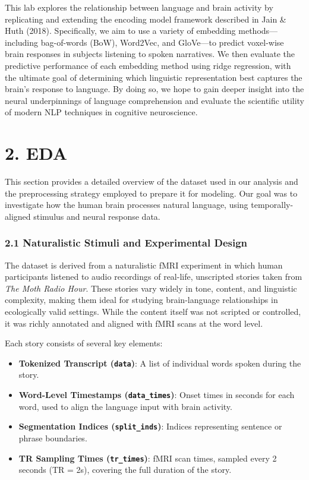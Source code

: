 \documentclass[11pt]{article}
\begin{document}
This lab explores the relationship between language and brain activity
by replicating and extending the encoding model framework described in
Jain \& Huth (2018). Specifically, we aim to use a variety of embedding
methods---including bag-of-words (BoW), Word2Vec, and GloVe---to predict
voxel-wise brain responses in subjects listening to spoken narratives.
We then evaluate the predictive performance of each embedding method
using ridge regression, with the ultimate goal of determining which
linguistic representation best captures the brain's response to
language. By doing so, we hope to gain deeper insight into the neural
underpinnings of language comprehension and evaluate the scientific
utility of modern NLP techniques in cognitive neuroscience.

    \hypertarget{eda}{%
\section{2. EDA}\label{eda}}

This section provides a detailed overview of the dataset used in our
analysis and the preprocessing strategy employed to prepare it for
modeling. Our goal was to investigate how the human brain processes
natural language, using temporally-aligned stimulus and neural response
data.

\hypertarget{naturalistic-stimuli-and-experimental-design}{%
\subsubsection{2.1 Naturalistic Stimuli and Experimental
Design}\label{naturalistic-stimuli-and-experimental-design}}

The dataset is derived from a naturalistic fMRI experiment in which
human participants listened to audio recordings of real-life, unscripted
stories taken from \emph{The Moth Radio Hour}. These stories vary widely
in tone, content, and linguistic complexity, making them ideal for
studying brain-language relationships in ecologically valid settings.
While the content itself was not scripted or controlled, it was richly
annotated and aligned with fMRI scans at the word level.

Each story consists of several key elements:

\begin{itemize}
\item
  \textbf{Tokenized Transcript (\texttt{data})}: A list of individual
  words spoken during the story.
\item
  \textbf{Word-Level Timestamps (\texttt{data\_times})}: Onset times in
  seconds for each word, used to align the language input with brain
  activity.
\item
  \textbf{Segmentation Indices (\texttt{split\_inds})}: Indices
  representing sentence or phrase boundaries.
\item
  \textbf{TR Sampling Times (\texttt{tr\_times})}: fMRI scan times,
  sampled every 2 seconds (TR = 2s), covering the full duration of the
  story.
\end{itemize}
\end{document}
